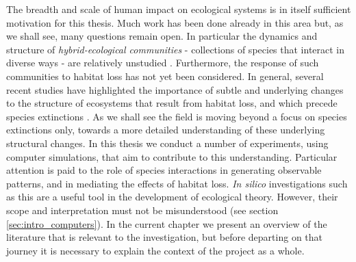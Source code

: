 The breadth and scale of human impact on ecological systems is in itself sufficient motivation for this thesis. Much work has been done already in this area but, as we shall see, many questions remain open. In particular the dynamics and structure of \emph{hybrid-ecological communities} - collections of species that interact in diverse ways - are relatively unstudied \cite{kefi2012more,fontaine2011ecological}. Furthermore, the response of such communities to habitat loss has not yet been considered. In general, several recent studies have highlighted the importance of subtle and underlying changes to the structure of ecosystems that result from habitat loss, and which precede species extinctions \cite{tylianakis2007habitat,sole2006ecological,laliberte2010deforestation,albrecht2007interaction,spiesman2013habitat,hagen2012biodiversity,gonzalez2011disentangled}. As we shall see the field is moving beyond a focus on species extinctions only, towards a more detailed understanding of these underlying structural changes. In this thesis we conduct a number of experiments, using computer simulations, that aim to contribute to this understanding. Particular attention is paid to the role of species interactions in generating observable patterns, and in mediating the effects of habitat loss. \emph{In silico} investigations such as this are a useful tool in the development of ecological theory. However, their scope and interpretation must not be misunderstood (see section \ref{sec:intro_computers}). In the current chapter we present an overview of the literature that is relevant to the investigation, but before departing on that journey it is necessary to explain the context of the project as a whole.

